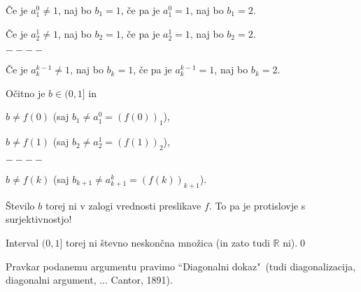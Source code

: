 \documentclass[11pt,paper=b5,footinclude,headinclude]{scrbook} %
\begin{document}
Če je $a_1^0 \neq 1$, naj bo $b_1 = 1$, če pa je $a_1^0 = 1$, naj bo $b_1 = 2$.

Če je $a_2^1 \neq 1$, naj bo $b_2 = 1$, če pa je $a_2^1 = 1$, naj bo $b_2 = 2$.

$----$

Če je $a_k^{k-1} \neq 1$, naj bo $b_k = 1$, če pa je $a_k^{k-1} = 1$, naj bo $b_k = 2$.

Očitno je $b\in (0,1]$ in

$b\neq f(0)$ (saj $b_1 \neq a^0_1 = (f(0))_1$),

$b\neq f(1)$ (saj $b_2 \neq a^1_2 = (f(1))_2$),

$----$

$b\neq f(k)$ (saj $b_{k+1} \neq a^{k}_{k+1} = (f(k))_{k+1}$).

Število $b$ torej ni v zalogi vrednosti preslikave $f$. To pa je protislovje s surjektivnostjo!

Interval $(0,1]$ torej ni števno neskončna množica (in zato tudi $\mathbb{R}$ ni).\qed

\medskip
Pravkar podanemu argumentu pravimo ``Diagonalni dokaz"~(tudi diagonalizacija, diagonalni argument, ...
Cantor, 1891).

\bigskip
\end{document}
